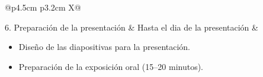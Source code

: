 \documentclass[12pt,a4paper,oneside]{report}
\begin{document}
\begin{table}[ht]
\begin{tabularx}{\textwidth}{@{}p{4.5cm} p{3.2cm} X@{}}
    \midrule

    6. Preparación de la presentación
      & Hasta el dia de la presentación
      & \begin{minipage}[t]{\linewidth}
          \begin{itemize}
            \item Diseño de las diapositivas para la presentación.
            \item Preparación de la exposición oral (15--20 minutos).
          \end{itemize}
        \end{minipage} \\

    \bottomrule
    \end{tabularx}
    \end{table}
\end{document}
